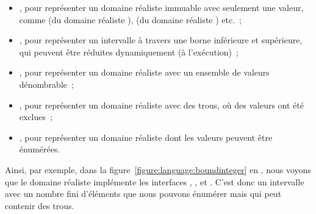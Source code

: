 \begin{itemize}

\item {}, pour représenter un domaine réaliste immuable avec
seulement une valeur, comme  (du domaine réaliste ),
 (du domaine réaliste ) etc.~;

\item {}, pour représenter un intervalle à travers une borne
inférieure et supérieure, qui peuvent être réduites dynamiquement (à
l'exécution)~;

\item {}, pour représenter un domaine réaliste avec un ensemble de
valeurs dénombrable~;

\item {}, pour représenter un domaine réaliste avec des trous, \ie
où des valeurs ont été exclues~;

\item {}, pour représenter un domaine réaliste dont les valeurs
peuvent être énumérées.

\end{itemize}

Ainsi, par exemple, dans la figure~\ref{figure:language:boundinteger} en
, nous voyons que le domaine réaliste  implémente
les interfaces , ,  et
. C'est donc un intervalle avec un nombre fini d'éléments que
nous pouvons énumérer mais qui peut contenir des trous.
